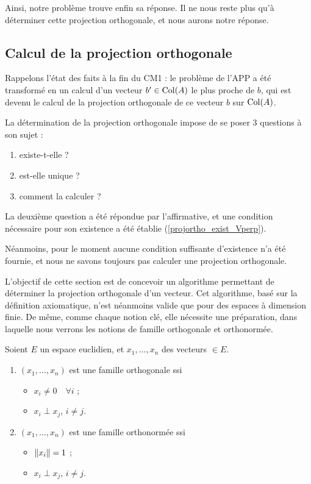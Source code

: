 Ainsi, notre problème trouve enfin sa réponse. Il ne nous reste plus qu'à déterminer cette projection orthogonale, et nous aurons notre réponse.

\subsection{Calcul de la projection orthogonale}

Rappelons l'état des faits à la fin du CM1 : le problème de l'APP a été transformé en un calcul d'un vecteur $b' \in \mathrm{Col}(A)$ le plus proche de $b$, qui est devenu le calcul de la projection orthogonale de ce vecteur $b$ sur $\mathrm{Col}(A)$.

La détermination de la projection orthogonale impose de se poser 3 questions à son sujet :
\begin{enumerate}
\item existe-t-elle ?
\item est-elle unique ?
\item comment la calculer ?
\end{enumerate}

La deuxième question a été répondue par l'affirmative, et une condition nécessaire pour son existence a été établie (\ref{projortho_exist_Vperp}).

Néanmoins, pour le moment aucune condition suffisante d'existence n'a été fournie, et nous ne savons toujours pas calculer une projection orthogonale.

L'objectif de cette section est de concevoir un \og algorithme \fg{} permettant de déterminer la projection orthogonale d'un vecteur. Cet algorithme, basé sur la définition axiomatique, n'est néanmoins valide que pour des espaces à dimension finie. De même, comme chaque notion clé, elle nécessite une préparation, dans laquelle nous verrons les notions de famille orthogonale et orthonormée.


\begin{defn}
Soient $E$ un espace euclidien, et $x_1, \ldots, x_n$ des vecteurs $\in E$.
\begin{enumerate}
\item $(x_1, \ldots, x_n)$ est une famille orthogonale ssi
\begin{itemize}
\item $x_i \neq 0 \quad \forall i$ ;
\item $x_i \perp x_j$, $i \neq j$.
\end{itemize}

\item $(x_1, \ldots, x_n)$ est une famille orthonormée ssi
\begin{itemize}
\item $\| x_i \| = 1$ ;
\item $x_i \perp x_j$, $i \neq j$.
\end{itemize}
\end{enumerate}
\end{defn}

